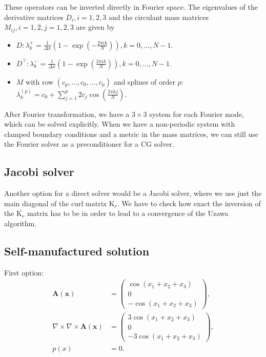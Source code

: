 \documentclass[12pt,a4paper,twoside]{article}
\newcommand{\K}{\mathrm{K}}
\newcommand{\xb}{{\mathbf{x}}}
\newcommand{\Ab}{{\mathbf{A}}}
\numberwithin{equation}{section}
\begin{document}
These operators can be inverted directly in Fourier space. The eigenvalues of the derivative matrices $D_i,i=1,2,3$ and the circulant mass matrices $M_{ij}, i=1,2,j=1,2,3$ are given by
\begin{itemize}
\item $D: \lambda_k^+=\frac{1}{\Delta x}\left(1-\exp\left(-\frac{2\pi i k}{N} \right) \right), k = 0, ...,N-1$. 
\item $D^\top: \lambda_k^-=\frac{1}{\Delta x}\left(1-\exp\left(\frac{2\pi i k}{N} \right) \right), k = 0, ...,N-1$.
\item $M$ with row $( c_p,...,c_0,...,c_p)$ and splines of order $p$: $\lambda_k^{(p)}= c_0 + \sum_{j=1}^p 2 c_j \cos\left(\frac{2 \pi k j}{N}\right) $.
\end{itemize}
After Fourier transformation, we have a $3 \times 3$ system for each Fourier mode, which can be solved explicitly. When we have a non-periodic system with clamped boundary conditions and a metric in the mass matrices, we can still use the Fourier solver as a preconditioner for a CG solver.

\subsection{Jacobi solver}
Another option for a direct solver would be a Jacobi solver, where we use just the main diagonal of the curl matrix $\K_r$. We have to check how exact the inversion of the $\K_r$ matrix has to be in order to lead to a convergence of the Uzawa algorithm.

\subsection{Self-manufactured solution}

First option:
\begin{align*}
\Ab(\xb)&=\begin{pmatrix} \cos(x_1+x_2+x_3)\\
0 \\-\cos(x_1+x_2+x_3)
\end{pmatrix},\\
\nabla \times \nabla \times \Ab(\xb)&=\begin{pmatrix} 3 \cos(x_1+x_2+x_3)\\
0\\ -3 \cos(x_1+x_2+x_3)
\end{pmatrix}, \\
p(x) &= 0.
\end{align*}
\end{document}
